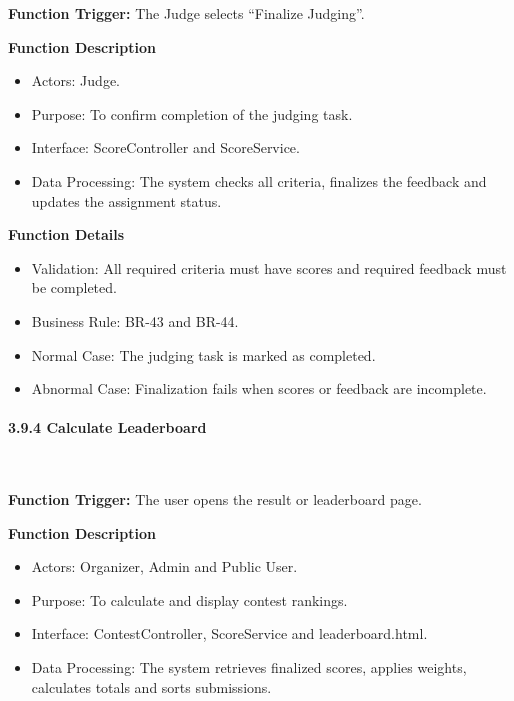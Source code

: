 \textbf{Function Trigger:} The Judge selects ``Finalize Judging''.

\textbf{Function Description}
\begin{itemize}[leftmargin=1.5em, nosep]
    \item Actors: Judge.
    \item Purpose: To confirm completion of the judging task.
    \item Interface: ScoreController and ScoreService.
    \item Data Processing: The system checks all criteria, finalizes the feedback and updates the assignment status.
\end{itemize}

\textbf{Function Details}
\begin{itemize}[leftmargin=1.5em, nosep]
    \item Validation: All required criteria must have scores and required feedback must be completed.
    \item Business Rule: BR-43 and BR-44.
    \item Normal Case: The judging task is marked as completed.
    \item Abnormal Case: Finalization fails when scores or feedback are incomplete.
\end{itemize}

\paragraph*{3.9.4 Calculate Leaderboard}\leavevmode\\[-0.5em]
\label{par:calculate-leaderboard}

\textbf{Function Trigger:} The user opens the result or leaderboard page.

\textbf{Function Description}
\begin{itemize}[leftmargin=1.5em, nosep]
    \item Actors: Organizer, Admin and Public User.
    \item Purpose: To calculate and display contest rankings.
    \item Interface: ContestController, ScoreService and leaderboard.html.
    \item Data Processing: The system retrieves finalized scores, applies weights, calculates totals and sorts submissions.
\end{itemize}

